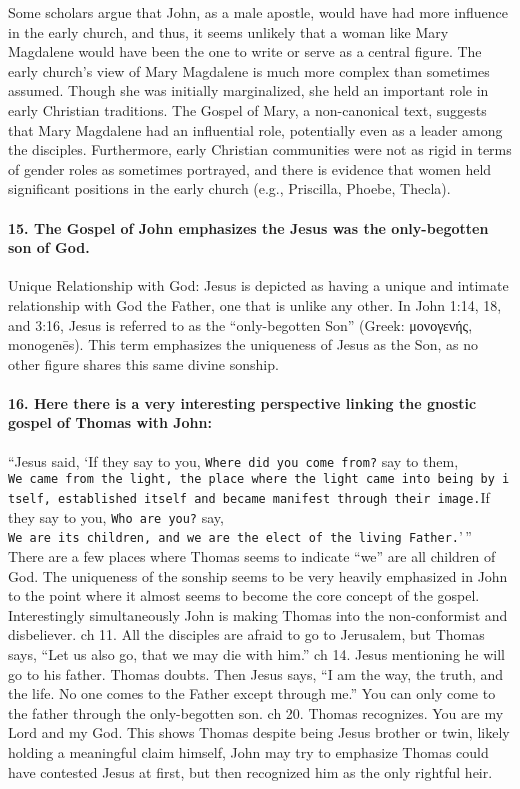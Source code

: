 Some scholars argue that John, as a male apostle, would have had more influence in the early church, and thus, it seems unlikely that a woman like Mary Magdalene would have been the one to write or serve as a central figure.
The early church's view of Mary Magdalene is much more complex than sometimes assumed.
Though she was initially marginalized, she held an important role in early Christian traditions.
The Gospel of Mary, a non-canonical text, suggests that Mary Magdalene had an influential role, potentially even as a leader among the disciples.
Furthermore, early Christian communities were not as rigid in terms of gender roles as sometimes portrayed, and there is evidence that women held significant positions in the early church (e.g., Priscilla, Phoebe, Thecla).

\paragraph{15.
The Gospel of John emphasizes the Jesus was the only-begotten son of God.}\label{par:the-gospel-of-john-emphasizes-the-jesus-was-the-only-begotten-son-of-god.}

Unique Relationship with God: Jesus is depicted as having a unique and intimate relationship with God the Father, one that is unlike any other.
In John 1:14, 18, and 3:16, Jesus is referred to as the ``only-begotten Son'' (Greek: μονογενής, monogenēs).
This term emphasizes the uniqueness of Jesus as the Son, as no other figure shares this same divine sonship.

\paragraph{16.
Here there is a very interesting perspective linking the gnostic gospel of Thomas with John:}\label{par:here-there-is-a-very-interesting-perspective-linking-the-gnostic-gospel-of-thomas-with-john}

``Jesus said, `If they say to you, \texttt{Where\ did\ you\ come\ from?} say to them, \texttt{We\ came\ from\ the\ light,\ the\ place\ where\ the\ light\ came\ into\ being\ by\ itself,\ established\ itself\ and\ became\ manifest\ through\ their\ image.}If they say to you, \texttt{Who\ are\ you?} say, \texttt{We\ are\ its\ children,\ and\ we\ are\ the\ elect\ of\ the\ living\ Father.}'\,'' There are a few places where Thomas seems to indicate ``we'' are all children of God.
The uniqueness of the sonship seems to be very heavily emphasized in John to the point where it almost seems to become the core concept of the gospel.
Interestingly simultaneously John is making Thomas into the non-conformist and disbeliever.
ch 11.
All the disciples are afraid to go to Jerusalem, but Thomas says, ``Let us also go, that we may die with him.'' ch 14.
Jesus mentioning he will go to his father.
Thomas doubts.
Then Jesus says, ``I am the way, the truth, and the life.
No one comes to the Father except through me.'' You can only come to the father through the only-begotten son.
ch 20.
Thomas recognizes.
You are my Lord and my God.
This shows Thomas despite being Jesus brother or twin, likely holding a meaningful claim himself, John may try to emphasize Thomas could have contested Jesus at first, but then recognized him as the only rightful heir.

